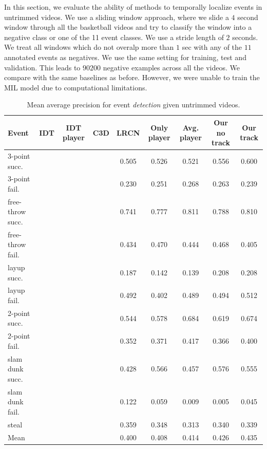 In this section, we evaluate the ability of methods to temporally localize events in untrimmed videos.
We use a sliding window approach, where we slide a $4$ second window
through all the basketball videos and try to classify the window into a negative
class or one of the 11 event classes. We use a stride length of $2$ seconds.
We treat all windows which do not overalp more than $1$ sec with any of the $11$ annotated
events as negatives. We use the same setting for training, test and validation.
This leads to $90200$ negative examples across all the videos.
 We compare with the same baselines as before. However, we were unable
 to train the MIL model due to computational limitations.

\begin{table}[ht!]
\begin{center}
\small
 \begin{tabular}{|l|c|c|c|c|c|c|c|c|}
  \hline
Event & IDT\cite{Wang_CVPR11} & IDT player\cite{Wang_CVPR11} & C3D \cite{Tran_arxiv14} & LRCN \cite{Donahue_arxiv14} & Only player & Avg. player & Our no track & Our track \\ \hline \hline
3-point succ.    &  &  &  & 0.505 & 0.526 & 0.521 & 0.556 & 0.600 \\
3-point fail.    &  &  &  & 0.230 & 0.251 & 0.268 & 0.263 & 0.239 \\
free-throw succ. &  &  &  & 0.741 & 0.777 & 0.811 & 0.788 & 0.810 \\
free-throw fail. &  &  &  & 0.434 & 0.470 & 0.444 & 0.468 & 0.405 \\
layup succ.      &  &  &  & 0.187 & 0.142 & 0.139 & 0.208 & 0.208 \\
layup fail.      &  &  &  & 0.492 & 0.402 & 0.489 & 0.494 & 0.512 \\
2-point succ.    &  &  &  & 0.544 & 0.578 & 0.684 & 0.619 & 0.674 \\
2-point fail.    &  &  &  & 0.352 & 0.371 & 0.417 & 0.366 & 0.400 \\
slam dunk succ.  &  &  &  & 0.428 & 0.566 & 0.457 & 0.576 & 0.555 \\
slam dunk fail.  &  &  &  & 0.122 & 0.059 & 0.009 & 0.005 & 0.045 \\
steal            &  &  &  & 0.359 & 0.348 & 0.313 & 0.340 & 0.339 \\ \hline \hline
Mean             &  &  &  & 0.400 & 0.408 & 0.414 & 0.426 & 0.435 \\ \hline
  \end{tabular}
\end{center}
  \caption{Mean average precision for event {\em detection} given
    untrimmed videos.}
  \label{tab:detection_res}
\end{table}


